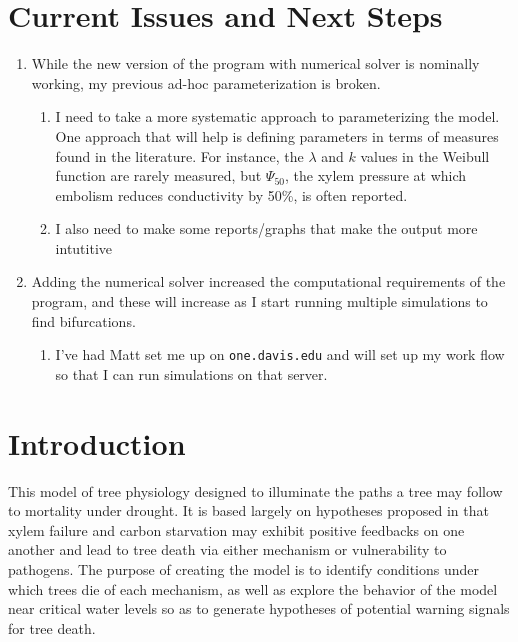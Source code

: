 \documentclass[12pt]{amsart}
\begin{document}
\section{Current Issues and Next Steps}
 
\begin{enumerate}
  \item While the new  version of the program with numerical solver is nominally working, my previous ad-hoc parameterization is broken. 
  \begin{enumerate}
  	\item I need to take a more systematic approach to parameterizing the model.  One approach that will help is defining parameters in terms of measures found in the literature.  For instance, the $\lambda$ and $k$ values in the Weibull function are rarely measured, but $\Psi_{50}$, the xylem pressure at which embolism reduces conductivity by 50\%, is often reported.
	\item I also need to make some reports/graphs that make the output more intutitive
  \end{enumerate}
  \item Adding the numerical solver increased the computational requirements of the program, and these will increase as I start running multiple simulations to find bifurcations.
  \begin{enumerate}
  	\item I've had Matt set me up on \texttt{one.davis.edu} and will set up my work flow so that I can run simulations on that server.
  \end{enumerate}
\end{enumerate}

\pagebreak


\section{Introduction}

This model of tree physiology designed to illuminate the paths a tree may follow to mortality under drought.  It is based largely on hypotheses proposed in \citet{McDowell2011} that xylem failure and carbon starvation may exhibit positive feedbacks on one another and lead to tree death via either mechanism or vulnerability to pathogens.  The purpose of creating the model is to identify  conditions under which trees die of each mechanism, as well as explore the behavior of the model near critical water levels so as to generate hypotheses of potential warning signals for tree death.
\end{document}
